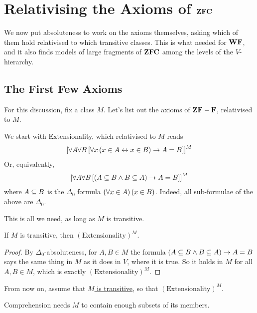 \section{Relativising the Axioms of $\mathbf{ZFC}$}

We now put absoluteness to work on the axioms themselves, asking which of them hold relativised to which transitive classes. This is what  needed for $\mathbf{WF}$, and it also finds models of large fragments of $\mathbf{ZFC}$ among the levels of the $V$-hierarchy.

\subsection{The First Few Axioms}

For this discussion, fix a class $M$. Let's list out the axioms of $\mathbf{ZF} - \mathbf{F}$, relativised to $M$.

We start with Extensionality, which relativised to $M$ reads
\begin{align*}
    \left[ \forall A \forall B \left[ \forall x \left( x \in A \leftrightarrow x \in B \right) \to A = B \right] \right]^M
\end{align*}
Or, equivalently,
\begin{align*}
    \left[ \forall A \forall B \left[ \left( A \subseteq B \land B \subseteq A \right) \to A = B \right] \right]^M
\end{align*}
where $A \subseteq B$ is the $\Delta_0$ formula $\left( \forall x \in A \right)\left( x \in B \right)$. Indeed, all sub-formulae of the above are $\Delta_0$.

This is all we need, as long as $M$ is transitive.

\begin{boxlemma}[Extensionality]
    If $M$ is transitive, then $(\text{Extensionality})^M$.
\end{boxlemma}
\begin{proof}
    By $\Delta_0$-absoluteness, for $A, B \in M$ the formula $\left( A \subseteq B \land B \subseteq A \right) \to A = B$ says the same thing in $M$ as it does in $V$, where it is true. So it holds in $M$ for all $A, B \in M$, which is exactly $(\text{Extensionality})^M$.
\end{proof}

From now on, assume that \underline{$M$ is transitive}, so that $(\text{Extensionality})^M$.

Comprehension needs $M$ to contain enough subsets of its members.

